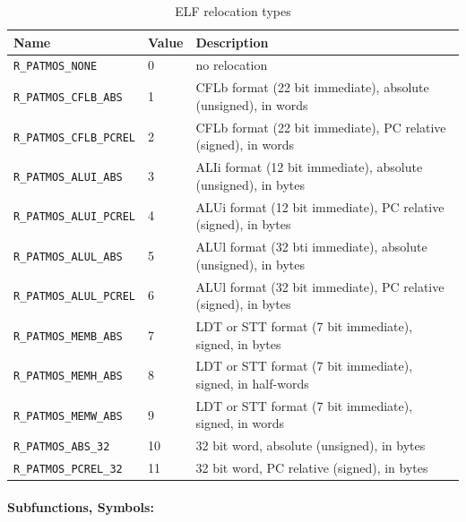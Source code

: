 \begin{table}
  \centering
  \begin{tabular}{lll}
    \toprule
    Name & Value & Description \\
    \midrule
\texttt{R\_PATMOS\_NONE}         & 0  & no relocation \\
\texttt{R\_PATMOS\_CFLB\_ABS}    & 1  & CFLb format (22 bit immediate), absolute (unsigned), in words \\
\texttt{R\_PATMOS\_CFLB\_PCREL}  & 2  & CFLb format (22 bit immediate), PC relative (signed), in words \\
\texttt{R\_PATMOS\_ALUI\_ABS}    & 3  & ALIi format (12 bit immediate), absolute (unsigned), in bytes \\
\texttt{R\_PATMOS\_ALUI\_PCREL}  & 4  & ALUi format (12 bit immediate), PC relative (signed), in bytes \\
\texttt{R\_PATMOS\_ALUL\_ABS}    & 5  & ALUl format (32 bti immediate), absolute (unsigned), in bytes \\
\texttt{R\_PATMOS\_ALUL\_PCREL}  & 6  & ALUl format (32 bit immediate), PC relative (signed), in bytes \\
\texttt{R\_PATMOS\_MEMB\_ABS}    & 7  & LDT or STT format (7 bit immediate), signed, in bytes \\
\texttt{R\_PATMOS\_MEMH\_ABS}    & 8  & LDT or STT format (7 bit immediate), signed, in half-words \\
\texttt{R\_PATMOS\_MEMW\_ABS}    & 9  & LDT or STT format (7 bit immediate), signed, in words \\
\texttt{R\_PATMOS\_ABS\_32}      & 10 & 32 bit word, absolute (unsigned), in bytes \\
\texttt{R\_PATMOS\_PCREL\_32}    & 11 & 32 bit word, PC relative (signed), in bytes \\
    \bottomrule    
  \end{tabular}
  \caption{ELF relocation types}
  \label{tab:elfrelocs}
\end{table}


\paragraph{Subfunctions, Symbols:}

